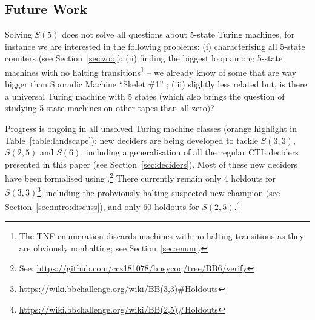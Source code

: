 \documentclass[sigconf,screen]{acmart}
\theoremstyle{definition} %
\numberwithin{equation}{section}
\theoremstyle{definition} %
\begin{document}
















% 

\subsection{Future Work}\label{sec:fw}

Solving $S(5)$ does not solve all questions about $5$-state Turing machines, for instance we are interested in the following problems: (i) characterising all 5-state counters (see Section~\ref{sec:zoo}); (ii) finding the biggest loop among 5-state machines with no halting transitions\footnote{The TNF enumeration discards machines with no halting transitions as they are obviously nonhalting; see Section~\ref{sec:enum}.} -- we already know of some that are way bigger than Sporadic Machine ``Skelet \#1'' \cite{ligocki2022motherofgiants}; (iii) slightly less related but, is there a universal Turing machine with 5 states (which also brings the question of studying 5-state machines on other tapes than all-zero)?

Progress is ongoing in all unsolved Turing machine classes (orange highlight in Table~\ref{table:landscape}): new deciders are being developed to tackle $S(3,3)$, $S(2,5)$ and $S(6)$, including a generalisation of all the regular CTL deciders presented in this paper (see Section~\ref{sec:deciders}). Most of these new deciders have been formalised using \Coq.\footnote{See: \url{https://github.com/ccz181078/busycoq/tree/BB6/verify}} There currently remain only $4$ holdouts for $S(3,3)$\footnote{\url{https://wiki.bbchallenge.org/wiki/BB(3,3)\#Holdouts}}, including the probviously halting suspected new champion (see Section~\ref{sec:intro:discuss}), and only $60$ holdouts for $S(2,5)$.\footnote{\url{https://wiki.bbchallenge.org/wiki/BB(2,5)\#Holdouts}}
\end{document}
